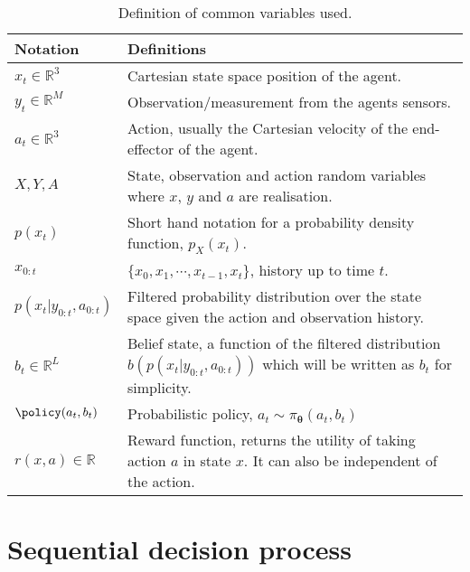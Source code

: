 \begin{table}
\begin{center}
\renewcommand{\arraystretch}{1.5}
\begin{tabular}{|l|p{9cm}|} 
\hline
    \textbf{Notation} 			 	& \textbf{Definitions} \\ \hline\hline
    $x_t \in \mathbb{R}^3$ 		 	& Cartesian state space position of the agent.\\
    $y_t \in \mathbb{R}^{M}$		 	& Observation/measurement from the agents sensors.\\
    $a_t \in \mathbb{R}^3$		 	& Action, usually the Cartesian velocity of the end-effector of the agent.\\
    $X,Y,A$				 	& State, observation and action random variables where $x$, $y$ and $a$ are realisation.\\
    $p(x_t)$ 					& Short hand notation for a probability density function, $p_{X}(x_t)$.\\
    $x_{0:t}$					& $\{x_0,x_1,\cdots,x_{t-1},x_t\}$, history up to time $t$.\\
    $p(x_t|y_{0:t},a_{0:t})$	 		& Filtered probability distribution over the state space given the action and observation history.\\
    $b_t \in \mathbb{R}^{L}$			& Belief state, a function of the filtered distribution 
						 $b(p(x_t|y_{0:t},a_{0:t}))$ which will be written as $b_t$ for simplicity.\\
    $\policy(a_t,b_t)$ 				& Probabilistic policy, $a_t \sim \pi_{\boldsymbol{\theta}}(a_t,b_t)$ \\
    $r(x,a) \in \mathbb{R}$			& Reward function, returns the utility of taking action $a$ in state $x$. It can also be independent of the action.
\\ \hline
\end{tabular}
\end{center}
\caption{Definition of common variables used.}
\label{tab:notation}
\end{table}


\section{Sequential decision process}

